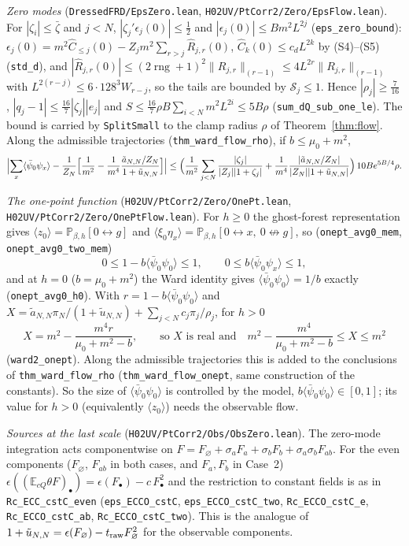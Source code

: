 \documentclass[11pt]{amsart}
\theoremstyle{definition}
\theoremstyle{remark}
\numberwithin{equation}{section}
\newcommand{\E}{\mathbb{E}}
\newcommand{\Pb}{\mathbb{P}}
\newcommand{\avg}[1]{\langle #1\rangle}
\begin{document}
\emph{Zero modes} (\texttt{DressedFRD/EpsZero.lean}, \texttt{H02UV/PtCorr2/Zero/EpsFlow.lean}). For $|\zeta_i|\le\bar\zeta$ and $j<N$,
$|\zeta_j'\epsilon_j(0)|\le\frac12$ and $|\epsilon_j(0)|\le Bm^2L^{2j}$ (\texttt{eps\_zero\_bound}): $\epsilon_j(0)=m^2\hat C_{\le j}(0)-Z_jm^2\sum_{r>j}\hat R_{j,r}(0)$,
$\hat C_k(0)\le c_dL^{2k}$ by (S4)--(S5) (\texttt{std\_d}), and $|\hat R_{j,r}(0)|\le(2\operatorname{rng}+1)^2\|R_{j,r}\|_{(r-1)}\le4L^{2r}\|R_{j,r}\|_{(r-1)}$ with
$L^{2(r-j)}\le6\cdot128^3W_{r-j}$, so the tails are bounded by $\mathcal S_j\le1$. Hence $|\rho_j|\ge\frac7{16}$, $|q_j-1|\le\frac{16}7|\zeta_j||e_j|$ and
$S\le\frac{16}7\rho B\sum_{i<N}m^2L^{2i}\le5B\rho$ (\texttt{sum\_dQ\_sub\_one\_le}). The bound is carried by \texttt{SplitSmall} to the clamp radius $\rho$ of
Theorem~\ref{thm:flow}. Along the admissible trajectories (\texttt{thm\_ward\_flow\_rho}), if $b\le\mu_0+m^2$,
\[
  \Bigl|\sum_x\avg{\bar\psi_0\psi_x}-\frac1{Z_N}\Bigl[\frac1{m^2}-\frac1{m^4}\frac{\tilde a_{N,N}/Z_N}{1+\tilde u_{N,N}}\Bigr]\Bigr|
  \le\Bigl(\frac1{m^2}\sum_{j<N}\frac{|\zeta_j|}{|Z_j||1+\zeta_j|}+\frac1{m^4}\frac{|\tilde a_{N,N}/Z_N|}{|Z_N||1+\tilde u_{N,N}|}\Bigr)\,10Be^{5B/4}\rho.
\]

\emph{The one-point function} (\texttt{H02UV/PtCorr2/Zero/OnePt.lean}, \texttt{H02UV/}\allowbreak\texttt{PtCorr2/Zero/OnePtFlow.lean}). For $h\ge0$ the ghost-forest
representation gives $\avg{z_0}=\Pb_{\beta,h}[0\leftrightarrow g]$ and $\avg{\xi_0\eta_x}=\Pb_{\beta,h}[0\leftrightarrow x,\ 0\not\leftrightarrow g]$, so
(\texttt{onept\_avg0\_mem}, \texttt{onept\_avg0\_two\_mem})
\[
  0\le1-b\avg{\bar\psi_0\psi_0}\le1,\qquad 0\le b\avg{\bar\psi_0\psi_x}\le1,
\]
and at $h=0$ ($b=\mu_0+m^2$) the Ward identity gives $\avg{\bar\psi_0\psi_0}=1/b$ exactly (\texttt{onept\_avg0\_h0}).
With $r=1-b\avg{\bar\psi_0\psi_0}$ and $X=\tilde a_{N,N}\pi_N/(1+\tilde u_{N,N})+\sum_{j<N}c_j\pi_j/\rho_j$, for $h>0$
\[
  X=m^2-\frac{m^4r}{\mu_0+m^2-b},\qquad\text{so $X$ is real and}\quad m^2-\frac{m^4}{\mu_0+m^2-b}\le X\le m^2
\]
(\texttt{ward2\_onept}). Along the admissible trajectories this is added to the conclusions of \texttt{thm\_ward\_flow\_rho}
(\texttt{thm\_ward\_flow\_onept}, same construction of the constants). So the size of $\avg{\bar\psi_0\psi_0}$ is controlled by
the model, $b\avg{\bar\psi_0\psi_0}\in[0,1]$; its value for $h>0$ (equivalently $\avg{z_0}$) needs the observable flow.

\emph{Sources at the last scale} (\texttt{H02UV/PtCorr2/Obs/ObsZero.lean}). The zero-mode integration acts componentwise on
$F=F_\varnothing+\sigma_aF_a+\sigma_bF_b+\sigma_a\sigma_bF_{ab}$. For the even components ($F_\varnothing$, $F_{ab}$ in both cases, and
$F_a,F_b$ in Case~2) $\epsilon((\E_{cQ}\theta F)_\bullet)=\epsilon(F_\bullet)-c\,F_\bullet^2$ and the restriction to constant fields is
as in \texttt{Rc\_ECC\_cstC\_even} (\texttt{eps\_ECCO\_cstC}, \texttt{eps\_ECCO\_cstC\_two}, \texttt{Rc\_ECCO\_cstC\_e},
\texttt{Rc\_ECCO\_cstC\_ab}, \texttt{Rc\_ECCO\_cstC\_two}). This is the analogue of $1+\tilde u_{N,N}=\epsilon(F_\varnothing)-t_{\rm raw}F_\varnothing^2$
for the observable components.
\end{document}
